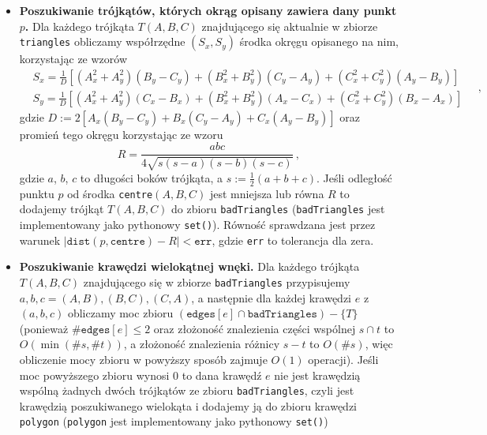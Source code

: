 \documentclass{myclass}
\begin{document}
\begin{itemize}
    \item \textbf{Poszukiwanie trójkątów, których okrąg opisany zawiera dany
    punkt \(p\).} Dla każdego trójkąta \(T(A,B,C)\) znajdującego się aktualnie w
    zbiorze \texttt{triangles} obliczamy współrzędne \((S_x,S_y)\) środka okręgu
    opisanego na nim, korzystając ze wzorów
    \begin{equation*}
        \begin{split}
            &S_x = \frac{1}{D}\left[(A_x^2+A_y^2)(B_y-C_y)+(B_x^2+B_y^2)(C_y-A_y)+(C_x^2+C_y^2)(A_y-B_y)\right]\\
            &S_y = \frac{1}{D}\left[(A_x^2+A_y^2)(C_x-B_x)+(B_x^2+B_y^2)(A_x-C_x)+(C_x^2+C_y^2)(B_x-A_x)\right]
        \end{split}\quad,
    \end{equation*}
    gdzie \(D:=2[A_x(B_y-C_y)+B_x(C_y-A_y)+C_x(A_y-B_y)]\) oraz promień tego
    okręgu korzystając ze wzoru 
    \begin{equation*}
        R = \frac{abc}{4\sqrt{s(s-a)(s-b)(s-c)}}\,,
    \end{equation*}
    gdzie \(a\), \(b\), \(c\) to długości boków trójkąta, a
    \(s:=\frac{1}{2}(a+b+c)\). Jeśli odległość punktu \(p\) od środka
    \texttt{centre\((A,B,C)\)} jest mniejsza lub równa \(R\) to dodajemy trójkąt
    \(T(A,B,C)\) do zbioru \texttt{badTriangles} (\texttt{badTriangles} jest
    implementowany jako pythonowy \texttt{set()}). Równość sprawdzana jest przez
    warunek \(|\texttt{dist}(p,\texttt{centre}) - R| < \texttt{err}\), gdzie
    \texttt{err} to tolerancja dla zera.

    \item \textbf{Poszukiwanie krawędzi wielokątnej wnęki.} Dla każdego trójkąta
    \(T(A,B,C)\) znajdującego się w zbiorze \texttt{badTriangles} przypisujemy
    \(a, b, c = (A,B), (B,C), (C,A)\), a następnie dla każdej krawędzi \(e\) z
    \((a,b,c)\) obliczamy moc zbioru
    \((\texttt{edges}[e]\cap\texttt{badTriangles})-\{T\}\) (ponieważ
    \(\#\texttt{edges}[e]\leq2\) oraz złożoność znalezienia części wspólnej \(s
    \cap t\) to \(O(\min(\#s,\#t))\), a złożoność znalezienia różnicy \(s - t\)
    to \(O(\#s)\), więc obliczenie mocy zbioru w powyższy sposób zajmuje
    \(O(1)\) operacji). Jeśli moc powyższego zbioru wynosi 0 to dana krawędź
    \(e\) nie jest krawędzią wspólną żadnych dwóch trójkątów ze zbioru
    \texttt{badTriangles}, czyli jest krawędzią poszukiwanego wielokąta i
    dodajemy ją do zbioru krawędzi \texttt{polygon} (\texttt{polygon} jest
    implementowany jako pythonowy \texttt{set()})


\end{itemize}
\end{document}
